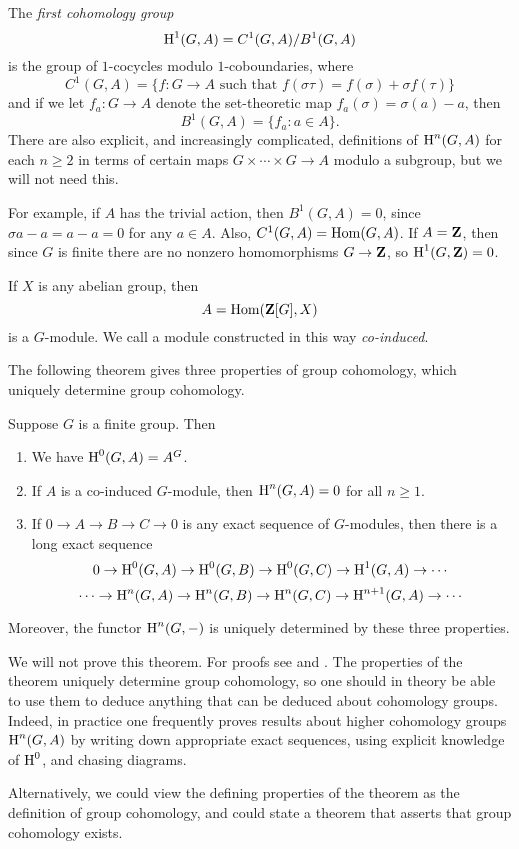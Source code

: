 The {\em first cohomology group}
$$
\operatorname{H}^1(G,A) = C^1(G,A)/B^1(G,A)
$$
is the group of $1$-cocycles modulo $1$-coboundaries, where
$$
  C^1(G, A) = \{f : G \to A \text{ such that } f(\sigma\tau) = f(\sigma) + \sigma f(\tau)\}
$$
and if we let $f_a: G \to A$ denote the set-theoretic map $f_a(\sigma) = \sigma(a)-a$,
then
$$ 
  B^1(G, A) = \{f_a :  a\in A\}.
$$
There are also explicit, and increasingly complicated, definitions of
$\operatorname{H}^n(G,A)$ for each $n\geq 2$ in terms of certain maps $G \times
\cdots \times G \to A$ modulo a subgroup, but we will not need this.

For example, if $A$ has the trivial action, then $B^1(G,A)=0$, since
$\sigma a - a = a -a =0$ for any $a\in A$.  Also, $C^1(G,A) =
\operatorname{Hom}(G,A)$.  If $A=\mathbf{Z}$, then since $G$ is finite there are no nonzero
homomorphisms $G\to \mathbf{Z}$, so $\operatorname{H}^1(G,\mathbf{Z})=0$.  

If $X$ is any abelian group, then
$$
  A = \operatorname{Hom}(\mathbf{Z}[G], X)
$$
is a $G$-module.  We call a module constructed in this way
{\em co-induced}.    

The following theorem gives three properties of group cohomology,
which uniquely determine group cohomology.  
\begin{theorem}
Suppose $G$ is a finite group.  Then
\begin{enumerate}
\item We have $\operatorname{H}^0(G,A) = A^G$.
\item If $A$ is a co-induced $G$-module, then $\operatorname{H}^n(G,A) = 0$ for all $n\geq 1$.
\item If $0\to A \to B \to C \to 0$ is any exact sequence of 
$G$-modules, then there is a long exact sequence
$$
 0 \to \operatorname{H}^0(G,A) \to \operatorname{H}^0(G,B) \to \operatorname{H}^0(G,C) \to \operatorname{H}^1(G,A) \to \cdots
$$
$$
   \cdots \to \operatorname{H}^{n}(G,A) \to \operatorname{H}^{n}(G,B) \to \operatorname{H}^{n}(G,C) \to \operatorname{H}^{n+1}(G,A) \to \cdots
$$
\end{enumerate}
Moreover, the functor $\operatorname{H}^n(G,-)$ is uniquely determined by
these three properties. 
\end{theorem}
We will not prove this theorem.  For proofs see
\cite[Atiyah-Wall]{cassels-frohlich} and
\cite[Ch.~7]{serre:localfields}. The properties of the theorem
uniquely determine group cohomology, so one should in theory be able
to use them to deduce anything that can be deduced about cohomology
groups.  Indeed, in practice one frequently proves results about
higher cohomology groups $\operatorname{H}^n(G,A)$ by writing down appropriate exact
sequences, using explicit knowledge of $\operatorname{H}^0$, and chasing diagrams.

\begin{remark}
  Alternatively, we could view the defining properties of the theorem
  as the definition of group cohomology, and could state a theorem
  that asserts that group cohomology exists.
\end{remark}

